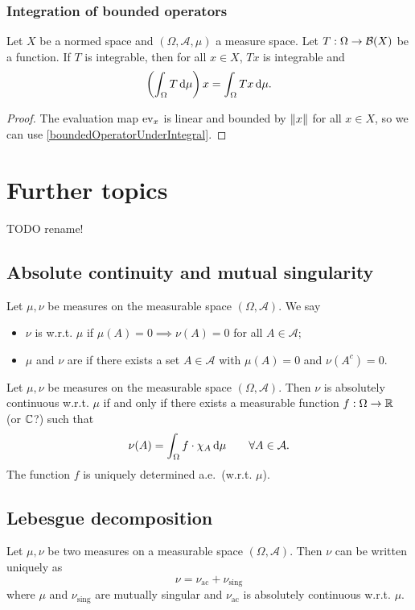 \subsubsection{Integration of bounded operators}
\begin{lemma} \label{integralBoundedOperator}
Let $X$ be a normed space and $(\Omega, \mathcal{A},\mu)$ a measure space. Let $T: \Omega \to \operatorname{\mathcal{B}}(X)$ be a function. If $T$ is integrable, then for all $x\in X$, $Tx$ is integrable and
\[ \left(\int_\Omega T\operatorname{d \!}{\mu}\right)x = \int_\Omega Tx\operatorname{d \!}{\mu}. \]
\end{lemma}
\begin{proof}
The evaluation map $\operatorname{ev}_x$ is linear and bounded by $\lVert x\rVert$ for all $x\in X$, so we can use \ref{boundedOperatorUnderIntegral}.
\end{proof}



\section{Further topics}
TODO rename!

\subsection{Absolute continuity and mutual singularity}
\begin{definition}
Let $\mu,\nu$ be measures on the measurable space $(\Omega,\mathcal{A})$. We say
\begin{itemize}
\item $\nu$ is  w.r.t. $\mu$ if $\mu(A)=0\implies \nu(A) = 0$ for all $A\in\mathcal{A}$;
\item $\mu$ and $\nu$ are  if there exists a set $A\in\mathcal{A}$ with $\mu(A) = 0$ and $\nu(A^c) = 0$.
\end{itemize}
\end{definition}

\begin{theorem}
Let $\mu,\nu$ be measures on the measurable space $(\Omega,\mathcal{A})$. Then $\nu$ is absolutely continuous w.r.t. $\mu$ \textup{if and only if} there exists a measurable function $f:\Omega\to\mathbb{R}$ (or $\mathbb{C}$?) such that
\[ \nu(A) = \int_\Omega f\cdot \chi_A \operatorname{d \!}{\mu} \qquad \forall A\in\mathcal{A}. \]
The function $f$ is uniquely determined a.e.\ (w.r.t. $\mu$).
\end{theorem}

\subsection{Lebesgue decomposition}
\begin{theorem}
Let $\mu, \nu$ be two measures on a measurable space $(\Omega, \mathcal{A})$. Then $\nu$ can be written uniquely as
\[ \nu = \nu_\text{ac} + \nu_\text{sing} \]
where $\mu$ and $\nu_\text{sing}$ are mutually singular and $\nu_\text{ac}$ is absolutely continuous w.r.t. $\mu$. 

\end{theorem}

